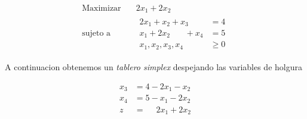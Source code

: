 \documentclass{article}
\begin{document}
\begin{equation*}
 \begin{aligned}
\text{Maximizar} \quad & 2x_1+2x_2\\
\text{sujeto a} \quad &
  \begin{aligned}
    2x_1 + x_2 + x_3\phantom{+x_4} &= 4\\
    x_1 + 2x_2\phantom{+x_3}+x_4 &= 5\\
     x_1,x_2, x_3, x_4 &\geq  0
  \end{aligned}
\end{aligned}
\end{equation*}

A continuacion obtenemos un \emph{tablero simplex} despejando las
variables de holgura

\begin{equation*}
 \begin{aligned}
    x_3 &= 4 - 2x_1 - x_2 \\
    x_4 &= 5 - x_1 - 2x_2\\
    \hline
    z &=\phantom{-1}2x_1+2x_2
\end{aligned}
\end{equation*}
\end{document}
